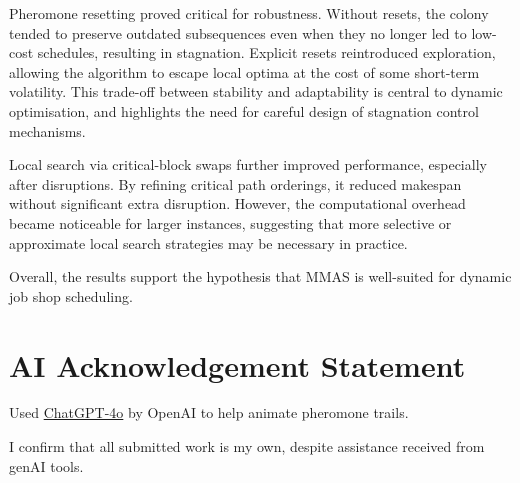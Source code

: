 \documentclass[final-report]{report-template}
\begin{document}
Pheromone resetting proved critical for robustness. Without resets, the colony tended to preserve outdated subsequences even when they no longer led to low-cost schedules, resulting in stagnation. Explicit resets reintroduced exploration, allowing the algorithm to escape local optima at the cost of some short-term volatility. This trade-off between stability and adaptability is central to dynamic optimisation, and highlights the need for careful design of stagnation control mechanisms.

Local search via critical-block swaps further improved performance, especially after disruptions. By refining critical path orderings, it reduced makespan without significant extra disruption. However, the computational overhead became noticeable for larger instances, suggesting that more selective or approximate local search strategies may be necessary in practice.

Overall, the results support the hypothesis that MMAS is well-suited for dynamic job shop scheduling.



\section{AI Acknowledgement Statement}
Used \href{https://chatgpt.com/}{ChatGPT-4o} by OpenAI to help animate pheromone trails.

I confirm that all submitted work is my own, despite assistance received from genAI tools.


\printbibliography[title = References, heading=bibintoc]
\end{document}
